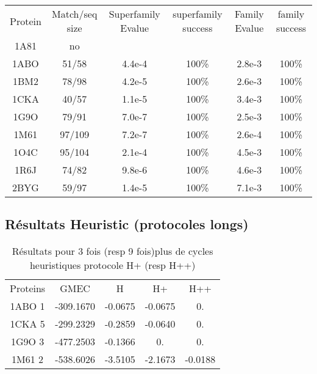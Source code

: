     \begin{table}[h]
           \raggedleft{}

      \begin{tabular}{cccccc}

        \toprule
        Protein & Match/seq size & Superfamily Evalue & superfamily success & Family Evalue & family success\\
        \cmidrule{1-6}
        1A81 & no & & & & \\
        1ABO & 51/58 & 4.4e-4 & 100\% & 2.8e-3 & 100\% \\
        1BM2 & 78/98 & 4.2e-5 & 100\% & 2.6e-3 & 100\% \\
        1CKA & 40/57 & 1.1e-5 & 100\% & 3.4e-3 & 100\% \\
        1G9O & 79/91 & 7.0e-7 & 100\% & 2.5e-3 & 100\%  \\
        1M61 & 97/109 & 7.2e-7 & 100\% & 2.6e-4 &  100\% \\
        1O4C & 95/104 & 2.1e-4 & 100\% & 4.5e-3 &  100\% \\
        1R6J & 74/82 & 9.8e-6 & 100\% & 4.6e-3 &  100\% \\
        2BYG & 59/97 & 1.4e-5 & 100\% & 7.1e-3 &  100\% \\
        \bottomrule        
      \end{tabular}      

\label{tab:superfamily_bestRE}       
\end{table}

    \clearpage



   \subsection{Résultats Heuristic (protocoles longs)}


    \begin{table}[h]
      \centering

      \begin{tabular}{ccccc}

        \toprule
        Proteins & GMEC & H & H+ & H++ \\
        \cmidrule{1-5}
        1ABO 1 & -309.1670 & -0.0675 & -0.0675 & 0. \\
        1CKA 5 & -299.2329 & -0.2859 & -0.0640 & 0. \\
        1G9O 3 & -477.2503 & -0.1366 & 0. & 0. \\
        1M61 2 & -538.6026 & -3.5105 & -2.1673 & -0.0188 \\
        \toprule


 \end{tabular}      
 \caption{Résultats pour 3 fois (resp 9 fois)plus de cycles heuristiques protocole H+ (resp H++)}
\label{tab:H+_H++}       
\end{table}


